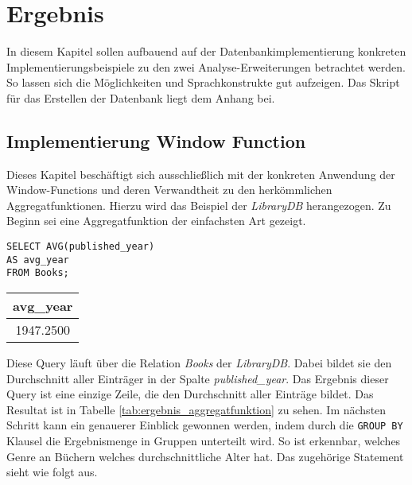 \chapter{Ergebnis}
\label{chap:ergebnis} In diesem Kapitel sollen aufbauend auf der Datenbankimplementierung
konkreten Implementierungsbeispiele zu den zwei Analyse-Erweiterungen betrachtet
werden. So lassen sich die Möglichkeiten und Sprachkonstrukte gut aufzeigen. Das
Skript für das Erstellen der Datenbank liegt dem Anhang bei.

\section{Implementierung Window Function}
\label{sec:window_function} Dieses Kapitel beschäftigt sich ausschließlich mit der
konkreten Anwendung der Window-Functions und deren Verwandtheit zu den herkömmlichen
Aggregatfunktionen. Hierzu wird das Beispiel der \textit{LibraryDB} herangezogen.
Zu Beginn sei eine Aggregatfunktion der einfachsten Art gezeigt.

\begin{minipage}{0.55\textwidth}
	 \begin{lstlisting}
SELECT AVG(published_year)
AS avg_year
FROM Books;
	\end{lstlisting}
\end{minipage}
\hfill
\begin{minipage}{0.45\textwidth}
	\centering
	\begin{tabular}{|c|}
		\hline
		\textbf{avg\_year} \\
		\hline
		1947.2500          \\
		\hline
	\end{tabular}
	 \label{tab:ergebnis_aggregatfunktion}
\end{minipage}

Diese Query läuft über die Relation \textit{Books} der \textit{LibraryDB}. Dabei
bildet sie den Durchschnitt aller Einträger in der Spalte \textit{published\_year}.
Das Ergebnis dieser Query ist eine einzige Zeile, die den Durchschnitt aller Einträge
bildet. Das Resultat ist in Tabelle \ref{tab:ergebnis_aggregatfunktion} zu sehen.
Im nächsten Schritt kann ein genauerer Einblick gewonnen werden, indem durch die
\texttt{GROUP BY} Klausel die Ergebnismenge in Gruppen unterteilt wird. So ist
erkennbar, welches Genre an Büchern welches durchschnittliche Alter hat. Das
zugehörige Statement sieht wie folgt aus.

